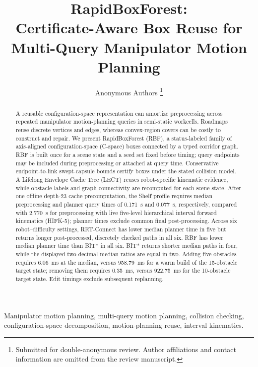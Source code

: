 \documentclass[journal]{IEEEtran}
\newcommand{\rbf}{RBF}
\newcommand{\cspace}{\mbox{C-space}}
\begin{document}
\title{RapidBoxForest:\\ Certificate-Aware Box Reuse for Multi-Query Manipulator Motion Planning}

\author{Anonymous Authors%
\thanks{Submitted for double-anonymous review. Author affiliations and contact information are omitted from the review manuscript.}}

\maketitle

\begin{abstract}
A reusable configuration-space representation can amortize preprocessing across
repeated manipulator motion-planning queries in semi-static workcells. Roadmaps
reuse discrete vertices and edges, whereas convex-region covers can be costly to
construct and repair. We present RapidBoxForest (\rbf{}), a status-labeled
family of axis-aligned configuration-space (\cspace{}) boxes connected by a
typed corridor graph. \rbf{} is built once for a scene state and a seed set fixed
before timing; query endpoints may be included during preprocessing or attached
at query time. Conservative endpoint-to-link swept-capsule bounds certify boxes
under the stated collision model. A Lifelong Envelope Cache Tree (LECT) reuses
robot-specific kinematic evidence, while obstacle labels and graph connectivity
are recomputed for each scene state. After one offline depth-23 cache
precomputation, the Shelf profile requires median preprocessing and planner query
times of 0.171~s and 0.077~s, respectively, compared with 2.770~s for
preprocessing with live five-level hierarchical interval forward kinematics
(HIFK-5); planner times exclude common final post-processing. Across six
robot--difficulty settings, RRT-Connect has lower median planner time in five
but returns longer post-processed, discretely checked paths in all six. \rbf{}
has lower median planner time than BIT* in all six. BIT* returns shorter median
paths in four, while the displayed two-decimal median ratios are equal in two.
Adding five obstacles requires 6.06~ms at the median, versus 958.79~ms for a warm build of the 15-obstacle target state;
removing them requires 0.35~ms, versus 922.75~ms for the 10-obstacle target
state. Edit timings exclude subsequent replanning.
\end{abstract}

\begin{IEEEkeywords}
Manipulator motion planning, multi-query motion planning, collision checking,
configuration-space decomposition, motion-planning reuse, interval kinematics.
\end{IEEEkeywords}
\end{document}
